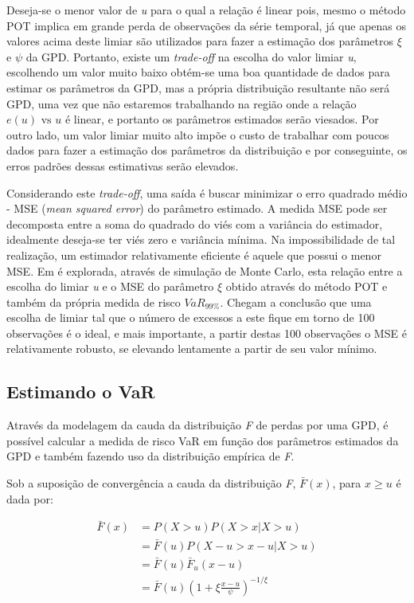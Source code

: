\documentclass[1p]{elsarticle}
\theoremstyle{definition}
\begin{document}
Deseja-se o menor valor de \emph{u} para o qual a relação é linear pois, mesmo o método POT implica em grande perda de observações da série temporal, já que apenas os valores acima deste limiar são utilizados para fazer a estimação dos parâmetros $\xi$ e $\psi$ da GPD. Portanto, existe um \emph{trade-off} na escolha do valor limiar \emph{u}, escolhendo um valor muito baixo obtém-se uma boa quantidade de dados para estimar os parâmetros da GPD, mas a própria distribuição resultante não será GPD, uma vez que não estaremos trabalhando na região onde a relação $e(u) \text{ vs } u$ é linear, e portanto os parâmetros estimados serão viesados. Por outro lado, um valor limiar muito alto impõe o custo de trabalhar com poucos dados para fazer a estimação dos parâmetros da distribuição e por conseguinte, os erros padrões dessas estimativas serão elevados.

Considerando este \emph{trade-off}, uma saída é buscar minimizar o erro quadrado médio - MSE (\emph{mean squared error}) do parâmetro estimado. A medida MSE pode ser decomposta entre a soma do quadrado do viés com a variância do estimador, idealmente deseja-se ter viés zero e variância mínima. Na impossibilidade de tal realização, um estimador relativamente eficiente é aquele que possui o menor MSE. Em \cite[seção 5.2.5, p. ~139]{McNeil2015} é explorada, através de simulação de Monte Carlo, esta relação entre a escolha do limiar \emph{u} e o MSE do parâmetro $\xi$ obtido através do método POT e também da própria medida de risco $VaR_{99\%}$. Chegam a conclusão que uma escolha de limiar tal que o número de excessos a este fique em torno de 100 observações é o ideal, e mais importante, a partir destas 100 observações o MSE é relativamente robusto, se elevando lentamente a partir de seu valor mínimo.

\subsection{Estimando o VaR}
\label{sec:var}

Através da modelagem da cauda da distribuição \emph{F} de perdas por uma GPD, é possível calcular a medida de risco VaR em função dos parâmetros estimados da GPD e também fazendo uso da distribuição empírica de \emph{F}.

Sob a suposição de convergência a cauda da distribuição \emph{F}, $\bar{F}(x)$, para $x \geq u$ é dada por:

\begin{align}
\label{eq:Ftail}
\bar{F}(x) & = P(X>u)P(X>x|X>u) \nonumber \\
& = \bar{F}(u) P(X-u>x-u|X>u) \nonumber \\
& = \bar{F}(u)\bar{F}_u(x-u) \nonumber \\
& = \bar{F}(u)\left(1+\xi \frac{x-u}{\psi}\right)^{-1/\xi}
\end{align}
\end{document}
